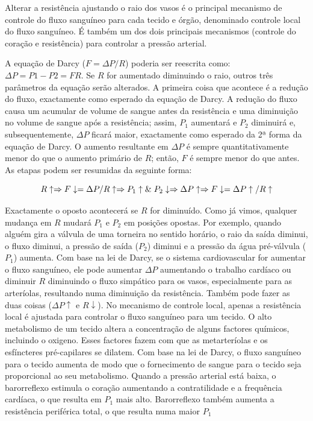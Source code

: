 \documentclass[
  portuguese,
  ]{book}
\begin{document}
Alterar a resistência ajustando o raio dos vasos é o principal mecanismo de controle do fluxo sanguíneo para cada tecido e órgão, denominado controle local do fluxo sanguíneo. É também um dos dois principais mecanismos (controle do coração e resistência) para controlar a pressão arterial.

A equação de Darcy (\(F = \Delta P / R\)) poderia ser reescrita como: \(\Delta P = P1- P2 = FR\). Se \(R\) for aumentado diminuindo o raio, outros três parâmetros da equação serão alterados. A primeira coisa que acontece é a redução do fluxo, exactamente como esperado da equação de Darcy. A redução do fluxo causa um acumular de volume de sangue antes da resistência e uma diminuição no volume de sangue após a resistência; assim, \(P_1\) aumentará e \(P_2\) diminuirá e, subsequentemente, \(\Delta P\) ficará maior, exactamente como esperado da 2ª forma da equação de Darcy. O aumento resultante em \(\Delta P\) é sempre quantitativamente menor do que o aumento primário de \(R\); então, \(F\) é sempre menor do que antes. As etapas podem ser resumidas da seguinte forma:

\[R\uparrow \Rightarrow F\downarrow = \Delta P/R \uparrow \Rightarrow P_1\uparrow \& \hspace{0.1cm} P_2 \downarrow \Rightarrow \Delta P \uparrow \Rightarrow F\downarrow = \Delta P \uparrow /R \uparrow\]

Exactamente o oposto acontecerá se \(R\) for diminuído. Como já vimos, qualquer mudança em \(R\) mudará \(P_1\) e \(P_2\) em posições opostas. Por exemplo, quando alguém gira a válvula de uma torneira no sentido horário, o raio da saída diminui, o fluxo diminui, a pressão de saída (\(P_2\)) diminui e a pressão da água pré-válvula (\(P_1\)) aumenta.
Com base na lei de Darcy, se o sistema cardiovascular for aumentar o fluxo sanguíneo, ele pode aumentar \(\Delta P\) aumentando o trabalho cardíaco ou diminuir \(R\) diminuindo o fluxo simpático para os vasos, especialmente para as arteríolas, resultando numa diminuição da resistência. Também pode fazer as duas coisas (\(\Delta P \uparrow\) e \(R\downarrow\)). No mecanismo de controle local, apenas a resistência local é ajustada para controlar o fluxo sanguíneo para um tecido. O alto metabolismo de um tecido altera a concentração de alguns factores químicos, incluindo o oxigeno. Esses factores fazem com que as metarteríolas e os esfíncteres pré-capilares se dilatem. Com base na lei de Darcy, o fluxo sanguíneo para o tecido aumenta de modo que o fornecimento de sangue para o tecido seja proporcional ao seu metabolismo.
Quando a pressão arterial está baixa, o barorreflexo estimula o coração aumentando a contratilidade e a frequência cardíaca, o que resulta em \(P_1\) mais alto. Barorreflexo também aumenta a resistência periférica total, o que resulta numa maior \(P_1\)
\end{document}
